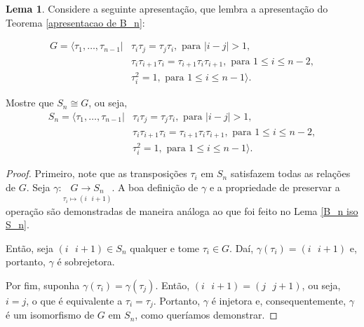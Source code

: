 \documentclass[a4paper,portuguese,11pt,twoside, leqno]{book}
\theoremstyle{definition}
\newtheorem{lemma}[theorem]{Lema}
\begin{document}
	\begin{lemma}
		\label{apresentacao de S_n}
		Considere a seguinte apresentação, que lembra a apresentação do Teorema \eqref{apresentacao de B_n}:
		
		\begin{align*} G = \langle \tau_1,\dots,\tau_{n-1} | &\tau_i\tau_j = \tau_j\tau_i, \text{ para }|i - j|>1,\\ &\tau_i\tau_{i+1}\tau_i = \tau_{i+1}\tau_i\tau_{i+1}, \text{ para } 1\leq i\leq n-2, \\ &\tau_i^2 = 1, \text{ para }1\leq i\leq n-1\rangle. 
		\end{align*}
		
		\par\vspace{0.3cm} Mostre que $S_n\cong G$, ou seja, \begin{align*} S_n = \langle \tau_1,\dots,\tau_{n-1} | &\tau_i\tau_j = \tau_j\tau_i, \text{ para }|i - j|>1,\\ &\tau_i\tau_{i+1}\tau_i = \tau_{i+1}\tau_i\tau_{i+1}, \text{ para } 1\leq i\leq n-2, \\ &\tau_i^2 = 1, \text{ para }1\leq i\leq n-1\rangle. 
		\end{align*}
		
		
		
		
	\end{lemma}
	
	\begin{proof}
		Primeiro, note que as transposições $\tau_i$ em $S_n$ satisfazem todas as relações de $G$. Seja $\gamma:\underset{\tau_i\mapsto (i\text{ }i+1)}{G\to S_n}$. A boa definição de $\gamma$ e a propriedade de preservar a operação são demonstradas de maneira análoga ao que foi feito no Lema \eqref{B_n iso S_n}.
		\par\vspace{0.3cm} Então, seja $(i\text{ }i+1)\in S_n$ qualquer e tome $\tau_i\in G$. Daí, $\gamma(\tau_i) = (i\text{ }i+1)$ e, portanto, $\gamma$ é sobrejetora.
		\par\vspace{0.3cm} Por fim, suponha $\gamma(\tau_i) = \gamma(\tau_j)$. Então, $(i\text{ }i+1) = (j\text{ }j+1)$, ou seja, $i = j$, o que é equivalente a $\tau_i = \tau_j$. Portanto, $\gamma$ é injetora e, consequentemente, $\gamma$ é um isomorfismo de $G$ em $S_n$, como queríamos demonstrar.
	\end{proof}
	
\end{document}

